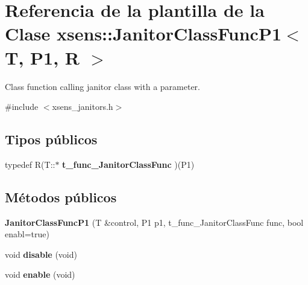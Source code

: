 \hypertarget{classxsens_1_1JanitorClassFuncP1}{\section{\-Referencia de la plantilla de la \-Clase xsens\-:\-:\-Janitor\-Class\-Func\-P1$<$ \-T, \-P1, \-R $>$}
\label{classxsens_1_1JanitorClassFuncP1}
}


\-Class function calling janitor class with a parameter.  




{\ttfamily \#include $<$xsens\-\_\-janitors.\-h$>$}

\subsection*{\-Tipos públicos}
\begin{DoxyCompactItemize}
\item 
\hypertarget{classxsens_1_1JanitorClassFuncP1_ae1c1b91aa5d0847609c8c566c7786921}{typedef \-R(\-T\-::$\ast$ {\bfseries t\-\_\-func\-\_\-\-Janitor\-Class\-Func} )(\-P1)}\label{classxsens_1_1JanitorClassFuncP1_ae1c1b91aa5d0847609c8c566c7786921}

\end{DoxyCompactItemize}
\subsection*{\-Métodos públicos}
\begin{DoxyCompactItemize}
\item 
\hypertarget{classxsens_1_1JanitorClassFuncP1_aa71ab8a6de75ad75e45cc87a22b4a8de}{{\bfseries \-Janitor\-Class\-Func\-P1} (\-T \&control, \-P1 p1, t\-\_\-func\-\_\-\-Janitor\-Class\-Func func, bool enabl=true)}\label{classxsens_1_1JanitorClassFuncP1_aa71ab8a6de75ad75e45cc87a22b4a8de}

\item 
\hypertarget{classxsens_1_1JanitorClassFuncP1_a4dbcc615b9961b5f0bb6684a7de5aacc}{void {\bfseries disable} (void)}\label{classxsens_1_1JanitorClassFuncP1_a4dbcc615b9961b5f0bb6684a7de5aacc}

\item 
\hypertarget{classxsens_1_1JanitorClassFuncP1_ab0c4626af4ea1193c5f95775af2809d9}{void {\bfseries enable} (void)}\label{classxsens_1_1JanitorClassFuncP1_ab0c4626af4ea1193c5f95775af2809d9}

\end{DoxyCompactItemize}



